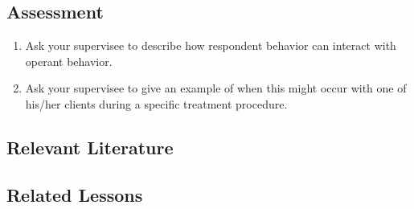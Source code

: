\subsection{Assessment}
\begin{enumerate}
\item Ask your supervisee to describe how respondent behavior can interact with operant behavior.
\item Ask your supervisee to give an example of when this might occur with one of his/her clients during a specific treatment procedure.
\end{enumerate}
%
\subsection{Relevant Literature}
\begin{refsection}
\nocite{cooper2007applied,
        pierce2013behavior,
        davis1977operant}
\printbibliography[heading=none]
\end{refsection}
%
\subsection{Related Lessons}
\fourgTwo{}\\
\fourgFive{}\\
\fourFKSeven{}\\
\fourFKThirteen{}\\
\fourFKFourteen{}\\
\fourFKFifteen{}\\
